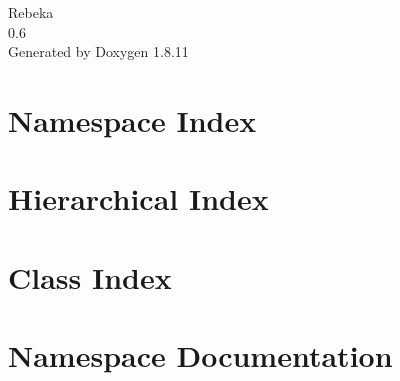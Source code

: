 \documentclass[twoside]{book}
\newcommand{\+}{\discretionary{\mbox{\scriptsize$\hookleftarrow$}}{}{}}
\newcommand{\clearemptydoublepage}{%
  \newpage{\pagestyle{empty}\cleardoublepage}%
}
\begin{document}
\hypersetup{pageanchor=false,
             bookmarksnumbered=true,
             pdfencoding=unicode
            }
\begin{titlepage}
\vspace*{7cm}
\begin{center}%
{\Large Rebeka \\[1ex]\large 0.\+6 }\\
\vspace*{1cm}
{\large Generated by Doxygen 1.8.11}\\
\end{center}
\end{titlepage}
\clearemptydoublepage
\tableofcontents
\clearemptydoublepage
{}
\hypersetup{pageanchor=true}

\chapter{Namespace Index}

\chapter{Hierarchical Index}

\chapter{Class Index}

\chapter{Namespace Documentation}


\end{document}
